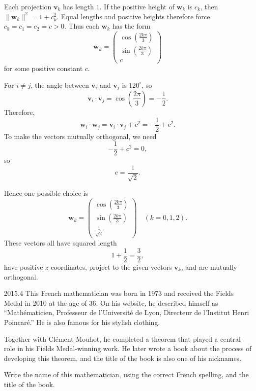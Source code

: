     \begin{solution}
        Each projection $\mathbf{v}_k$ has length $1$. If the positive height of $\mathbf{w}_k$ is $c_k$, then $\|\mathbf{w}_k\|^2=1+c_k^2$. Equal lengths and positive heights therefore force $c_0=c_1=c_2=c>0$. Thus each $\mathbf{w}_k$ has the form
        \[
            \mathbf{w}_k
            =
            \begin{pmatrix}
                \cos\left(\frac{2k\pi}{3}\right) \\
                \sin\left(\frac{2k\pi}{3}\right) \\
                c
            \end{pmatrix}
        \]
        for some positive constant $c$.

        For $i\neq j$, the angle between $\mathbf{v}_i$ and $\mathbf{v}_j$ is $120^\circ$, so
        \[
            \mathbf{v}_i\cdot\mathbf{v}_j
            =
            \cos\left(\frac{2\pi}{3}\right)
            =
            -\frac{1}{2}.
        \]
        Therefore,
        \[
            \mathbf{w}_i\cdot\mathbf{w}_j
            =
            \mathbf{v}_i\cdot\mathbf{v}_j+c^2
            =
            -\frac{1}{2}+c^2.
        \]
        To make the vectors mutually orthogonal, we need
        \[
            -\frac{1}{2}+c^2=0,
        \]
        so
        \[
            c=\frac{1}{\sqrt{2}}.
        \]

        Hence one possible choice is
        \[
            \boxed{
            \mathbf{w}_k
            =
            \begin{pmatrix}
                \cos\left(\frac{2k\pi}{3}\right) \\
                \sin\left(\frac{2k\pi}{3}\right) \\
                \frac{1}{\sqrt{2}}
            \end{pmatrix}
            \quad
            (k=0,1,2)
            }.
        \]
        These vectors all have squared length
        \[
            1+\frac{1}{2}
            =
            \frac{3}{2},
        \]
        have positive $z$-coordinates, project to the given vectors $\mathbf{v}_k$, and are mutually
        orthogonal.
    \end{solution}

    \begin{pastproblem}{2015.4}
        This French mathematician was born in 1973 and received the Fields Medal in 2010 at the age
        of $36$. On his website, he described himself as ``Math\'ematicien, Professeur de
        l'Universit\'e de Lyon, Directeur de l'Institut Henri Poincar\'e.'' He is also famous for
        his stylish clothing.

        Together with Cl\'ement Mouhot, he completed a theorem that played a central role in his
        Fields Medal-winning work. He later wrote a book about the process of developing this
        theorem, and the title of the book is also one of his nicknames.

        Write the name of this mathematician, using the correct French spelling, and the title of
        the book.
    \end{pastproblem}

